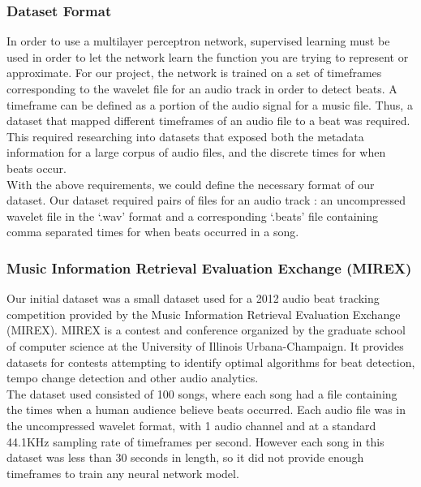 \subsubsection{Dataset Format}

In order to use a multilayer perceptron network, supervised learning must be used in order to let the network learn the function you are trying to represent or approximate. For our project, the network is trained on a set of timeframes corresponding to the wavelet file for an audio track in order to detect beats. A timeframe can be defined as a portion of the audio signal for a music file. Thus, a dataset that mapped different timeframes of an audio file to a beat was required. This required researching into datasets that exposed both the metadata information for a large corpus of  audio files, and the discrete times for when beats occur.\\

With the above requirements, we could define the necessary format of our dataset. Our dataset required pairs of files for an audio track : an uncompressed wavelet file in the ‘.wav’ format and a corresponding ‘.beats’ file containing comma separated times for when beats occurred in a song.\\

\subsubsection{Music Information Retrieval Evaluation Exchange (MIREX)}

Our initial dataset was a small dataset used for a 2012 audio beat tracking competition provided by the Music Information Retrieval Evaluation Exchange (MIREX). MIREX is a contest and conference organized by the graduate school of computer science at the University of Illinois Urbana-Champaign. It provides datasets for contests attempting to identify optimal algorithms for beat detection, tempo change detection and other audio analytics. \\

The dataset used consisted of 100 songs, where each song had a file containing the times when a human audience believe beats occurred. Each audio file was in the uncompressed wavelet format, with 1 audio channel and at a standard 44.1KHz sampling rate of timeframes per second. However each song in this dataset was less than 30 seconds in length, so it did not provide enough timeframes to train any neural network model. \\

